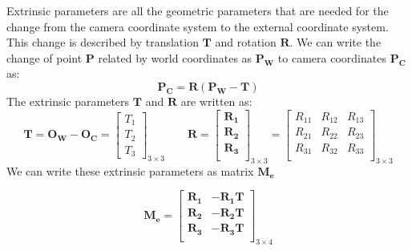 Extrinsic parameters are all the geometric parameters that are needed for the change from the camera coordinate system to the external coordinate system. This change is described by translation $\pmb{T}$ and rotation $\pmb{R}$. We can write the change of point $\pmb{P}$ related by world coordinates as $\pmb{P_W}$ to camera coordinates $\pmb{P_C}$ as:
\[
    \pmb{P_C} = \pmb{R}(\pmb{P_W}-\pmb{T})
\]
The extrinsic parameters $\pmb{T}$ and $\pmb{R}$ are written as:
\[
    \pmb{T} = \pmb{O_W} - \pmb{O_C} = \begin{bmatrix}
                                        T_1 \\
                                        T_2 \\
                                        T_3
                                        \end{bmatrix}_{3\times3}
                                        \qquad
    \pmb{R} =
    \begin{bmatrix}
        \pmb{R_{1}} \\
        \pmb{R_{2}} \\
        \pmb{R_{3}} \\
    \end{bmatrix}_{3\times3}
    = \begin{bmatrix}
        R_{11} & R_{12} & R_{13} \\
        R_{21} & R_{22} & R_{23} \\
        R_{31} & R_{32} & R_{33} \\
    \end{bmatrix}_{3\times3}
\]
We can write these extrinsic parameters as matrix $\pmb{M_e}$

\[
    \pmb{M_e} = 
    \begin{bmatrix}
        \pmb{R_1} & -\pmb{R_1 T} \\
        \pmb{R_2} & -\pmb{R_2 T} \\
        \pmb{R_3} & -\pmb{R_3 T} \\        
    \end{bmatrix}_{3\times4}
\]